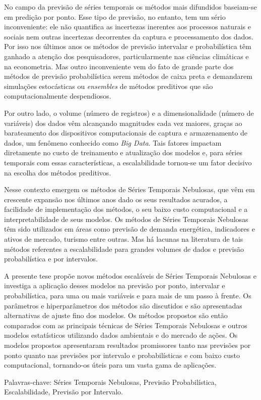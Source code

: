 \begin{resumo}

No campo da previsão de séries temporais os métodos mais difundidos baseiam-se em predição por ponto. Esse tipo de previsão, no entanto, tem um sério inconveniente: ele não quantifica as incertezas inerentes aos processos naturais e sociais nem outras incertezas decorrentes da captura e processamento dos dados. Por isso nos últimos anos os métodos de previsão intervalar e probabilística têm ganhado a atenção dos pesquisadores, particularmente nas ciências climáticas e na econometria. Mas outro inconveniente vem do fato de grande parte dos métodos de previsão probabilística serem métodos de caixa preta e demandarem simulações estocásticas ou \textit{ensembles} de métodos preditivos que são computacionalmente despendiosos.

Por outro lado, o volume (número de registros) e a dimensionalidade (número de variáveis) dos dados vêm alcançando magnitudes cada vez maiores, graças ao barateamento dos dispositivos computacionais de captura e armazenamento de dados, um fenômeno conhecido como \textit{Big Data}. Tais fatores impactam diretamente no custo de treinamento e atualização dos modelos e, para séries temporais com essas características, a escalabilidade tornou-se um fator decisivo na escolha dos métodos preditivos.

Nesse contexto emergem os métodos de Séries Temporais Nebulosas, que vêm em crescente expansão nos últimos anos dado os seus resultados acurados, a facilidade de implementação dos métodos, o seu baixo custo computacional e a interpretabilidade de seus modelos. Os métodos de Séries Temporais Nebulosas têm sido utilizados em áreas como previsão de demanda energética, indicadores e ativos de mercado, turismo entre outras. Mas há lacunas na literatura de tais métodos referentes a escalabilidade para grandes volumes de dados e  previsão probabilística e por intervalos.

A presente tese propõe novos métodos escaláveis de Séries Temporais Nebulosas e investiga a aplicação desses modelos na previsão por ponto, intervalar e probabilística, para uma ou mais variáveis e para mais de um passo à frente. Os parâmetros e hiperparâmetros dos métodos são discutidos e são apresentadas alternativas de ajuste fino dos modelos. Os métodos propostos são então comparados com as principais técnicas de Séries Temporais Nebulosas e outros modelos estatísticos utilizando dados ambientais e do mercado de ações. Os modelos propostos apresentaram resultados promissores tanto nas previsões por ponto quanto nas previsões por intervalo e probabilísticas e com baixo custo computacional, tornando-os úteis para um vasta gama de aplicações.
        
Palavras-chave: Séries Temporais Nebulosas, Previsão Probabilística, Escalabilidade, Previsão por Intervalo.

\end{resumo}

